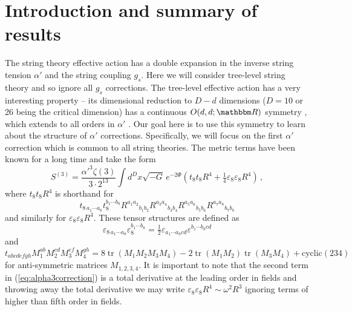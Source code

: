 \documentclass[a4paper,11pt]{article}
\DeclareMathOperator{\tr}{tr}
\begin{document}
\section{Introduction and summary of results}
The string theory effective action has a double expansion in the inverse string tension $\alpha'$ and the string coupling $g_s$. Here we will consider tree-level string theory and so ignore all $g_s$ corrections. The tree-level effective action has a very interesting property -- its dimensional reduction to $D-d$ dimensions ($D=10$ or 26 being the critical dimension) has a continuous $O(d,d;\mathbbm R)$ symmetry \cite{Meissner:1991zj,Meissner:1991ge}, which extends to all orders in $\alpha'$ \cite{Sen:1991zi}. Our goal here is to use this symmetry to learn about the structure of $\alpha'$ corrections. Specifically, we will focus on the first $\alpha'$ correction which is common to all string theories. The metric terms have been known for a long time and take the form \cite{Gross:1986iv,Grisaru:1986vi,Freeman:1986zh,Cai:1986sa,Gross:1986mw,Jack:1988sw}
\begin{equation}
S^{(3)}=\frac{\alpha'^3\zeta(3)}{3\cdot 2^{13}}\int d^Dx\sqrt{-G}\,e^{-2\Phi}(t_8t_8R^4+\tfrac14\varepsilon_8\varepsilon_8R^4)\,,
\label{eq:alpha3correction}
\end{equation}
where $t_8t_8R^4$ is shorthand for
\begin{equation}
t_{8\,a_1\cdots a_8}t_8^{b_1\cdots b_8}R^{a_1a_2}{}_{b_1b_2}R^{a_3a_4}{}_{b_3b_4}R^{a_5a_6}{}_{b_5b_6}R^{a_7a_8}{}_{b_7b_8}
\end{equation}
and similarly for $\varepsilon_8\varepsilon_8R^4$. These tensor structures are defined as
\begin{equation}
\varepsilon_{8\,a_1\cdots a_8}\varepsilon_8^{b_1\cdots b_8}=\tfrac12\varepsilon_{a_1\cdots a_8cd}\varepsilon^{b_1\cdots b_8cd}
\end{equation}
and
\begin{equation}
t_{abcdefgh}M_1^{ab}M_2^{cd}M_3^{ef}M_4^{gh}
=
8\tr(M_1M_2M_3M_4)
-2\tr(M_1M_2)\tr(M_3M_4)
+\mathrm{cyclic}(234)
\label{eq:t8}
\end{equation}
for anti-symmetric matrices $M_{1,2,3,4}$. It is important to note that the second term in (\ref{eq:alpha3correction}) is a total derivative at the leading order in fields and throwing away the total derivative we may write $\varepsilon_8\varepsilon_8R^4\sim\omega^2R^3$ ignoring terms of higher than fifth order in fields.
\end{document}
